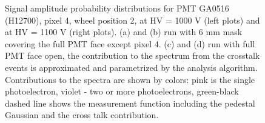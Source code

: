 \begin{figure}[h!bt] 
\centering 
  \caption{Signal amplitude probability distributions for PMT GA0516 (H12700), pixel 4, wheel position 2, at HV = 1000 V (left plots) and at HV = 1100 V (right plots). (a) and (b) run with 6 mm mask covering the full PMT face except pixel 4. (c) and (d) run with full PMT face open, the contribution to the spectrum from the crosstalk events is approximated and parametrized by the analysis algorithm. Contributions to the spectra are shown by colors: pink is the single photoelectron, violet - two or more photoelectrons, green-black dashed line shows the measurement function including the pedestal Gaussian and the cross talk contribution. 
    }
\label{fig:GA0516_3}
\end{figure}
